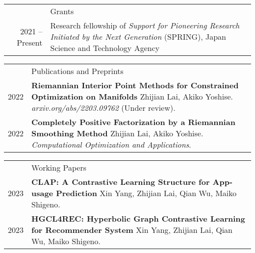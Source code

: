 \documentclass[letterpaper,11pt]{article}
\newcommand{\headingfont}{\Large\color{OliveGreen}}
\newenvironment{SectionTable}[1]{
	\renewcommand*{\arraystretch}{1.7}
	\setlength{\tabcolsep}{10pt}
	\begin{longtable}{Rp{5.2in}} & #1 \\ %
	}
	{
	\end{longtable}\vspace{-.3cm}
}
\newenvironment{SectionTableSingleSpace}[1]{
	\renewcommand*{\arraystretch}{1.2}
	\setlength{\tabcolsep}{10pt}
	\begin{longtable}{Rp{5.2in}} & #1 \\[0.6em]
	}
	{
\end{longtable}\vspace{-.3cm}
}
\begin{document}
\begin{SectionTable}{\headingfont Grants}
	2021 -- Present &
	Research fellowship of \textit{Support for Pioneering Research Initiated by the Next Generation} (SPRING), Japan Science and Technology Agency
\end{SectionTable}


%
%
%
%
%


\begin{SectionTable}{\headingfont Publications and Preprints} 
2022 & 
\textbf{Riemannian Interior Point Methods for Constrained Optimization on Manifolds} \newline
{Zhijian Lai}, Akiko Yoshise. \newline
\textit{arxiv.org/abs/2203.09762} (Under review). \\

2022 & 
\textbf{Completely Positive Factorization by a Riemannian Smoothing Method} \newline
{Zhijian Lai}, Akiko Yoshise. \newline
\textit{Computational Optimization and Applications}. \\
\end{SectionTable}


\begin{SectionTable}{\headingfont Working Papers} 
	2023 & 
	\textbf{CLAP: A Contrastive Learning Structure for App-usage Prediction} \newline
	Xin Yang, Zhijian Lai, Qian Wu, Maiko Shigeno. \\
	
	2023 & 
	\textbf{HGCL4REC: Hyperbolic Graph Contrastive Learning for Recommender System} \newline
	Xin Yang, Zhijian Lai, Qian Wu, Maiko Shigeno. \\
\end{SectionTable}
\end{document}
